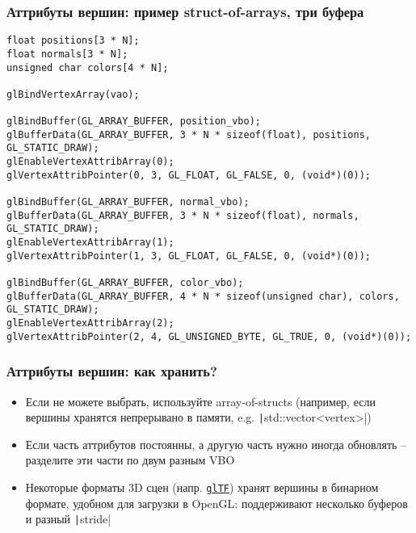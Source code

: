 \documentclass[10pt]{beamer}
\begin{document}
\begin{frame}[fragile]
\frametitle{Аттрибуты вершин: пример struct-of-arrays, три буфера}
\begin{verbatim}
float positions[3 * N];
float normals[3 * N];
unsigned char colors[4 * N];

glBindVertexArray(vao);

glBindBuffer(GL_ARRAY_BUFFER, position_vbo);
glBufferData(GL_ARRAY_BUFFER, 3 * N * sizeof(float), positions, GL_STATIC_DRAW);
glEnableVertexAttribArray(0);
glVertexAttribPointer(0, 3, GL_FLOAT, GL_FALSE, 0, (void*)(0));

glBindBuffer(GL_ARRAY_BUFFER, normal_vbo);
glBufferData(GL_ARRAY_BUFFER, 3 * N * sizeof(float), normals, GL_STATIC_DRAW);
glEnableVertexAttribArray(1);
glVertexAttribPointer(1, 3, GL_FLOAT, GL_FALSE, 0, (void*)(0));

glBindBuffer(GL_ARRAY_BUFFER, color_vbo);
glBufferData(GL_ARRAY_BUFFER, 4 * N * sizeof(unsigned char), colors, GL_STATIC_DRAW);
glEnableVertexAttribArray(2);
glVertexAttribPointer(2, 4, GL_UNSIGNED_BYTE, GL_TRUE, 0, (void*)(0));
\end{verbatim}
\vspace*{-1.5cm}
\begin{center}
\end{center}
\end{frame}

\begin{frame}[fragile]
\frametitle{Аттрибуты вершин: как хранить?}
\begin{itemize}
\item Если не можете выбрать, используйте array-of-structs (например, если вершины хранятся непрерывано в памяти, e.g. \texttt|std::vector<vertex>|)
\pause
\item Если часть аттрибутов постоянны, а другую часть нужно иногда обновлять -- разделите эти части по двум разным VBO
\pause
\item Некоторые форматы 3D сцен (напр. \href{https://registry.khronos.org/glTF/specs/2.0/glTF-2.0.html}{\texttt{glTF}}) хранят вершины в бинарном формате, удобном для загрузки в OpenGL: поддерживают несколько буферов и разный \texttt|stride|
\end{itemize}
\end{frame}
\end{document}
